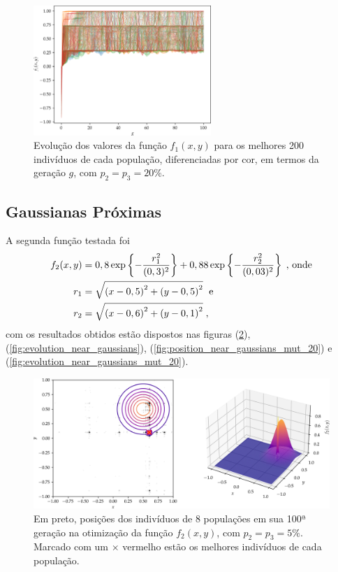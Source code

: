 \begin{figure}[p]
  \centering
  \includegraphics[width=0.6\textwidth]{imagens/high_prob/evolution_damped_cossine.png}
  \caption{
    Evolução dos valores da função $ f_1(x,y) $ para os
    melhores 200 indivíduos de cada população, diferenciadas por cor, em termos da geração $g$,
    com $ p_2 = p_3 = 20\% $.
  }
  \label{fig:evolution_damped_cossine_mut_20}
\end{figure}

\subsection{Gaussianas Próximas}

A segunda função testada foi
\begin{align}
  \begin{split}
    f_2(x,y) & = 0,8 \exp\left\{-\frac{r_1^2}{(0,3)^2}\right\} +
    0,88 \exp\left\{-\frac{r_2^2}{(0,03)^2}\right\} \;\text{, onde} \\
    r_1      & = \sqrt{
      \left(x - 0,5\right)^2 +
      \left(y - 0,5\right)^2
    } \;\text{ e} \\
    r_2      & = \sqrt{
      \left(x - 0,6\right)^2 +
      \left(y - 0,1\right)^2
    } \;\mathrm{,}
  \end{split}
  \label{eq:func_near_gaussians}
\end{align}
com os resultados obtidos estão dispostos nas figuras (\ref{fig:position_near_gaussians}),
(\ref{fig:evolution_near_gaussians}), (\ref{fig:position_near_gaussians_mut_20}) e 
(\ref{fig:evolution_near_gaussians_mut_20}).

\begin{figure}[p]
  \centering
  \includegraphics[width=\textwidth]{imagens/low_prob/position_near_gaussians.png}
  \caption{
    Em preto, posições dos indivíduos de 8 populações em sua 100ª geração na otimização da função
    $ f_2(x,y) $, com $ p_2 = p_3 = 5\% $. Marcado com um $\times$ vermelho estão os 
    melhores indivíduos de cada população.
  }
  \label{fig:position_near_gaussians}
\end{figure}

